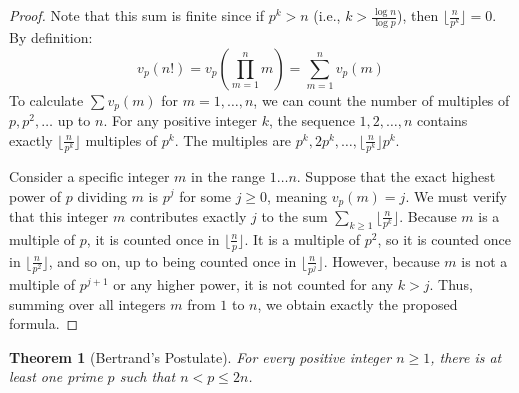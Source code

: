 \documentclass[a4paper]{article}
\newtheorem{theorem}{Theorem}
\begin{document}
\begin{proof}
  Note that this sum is finite since if $p^k > n$ (i.e., $k >
  \frac{\log n}{\log p}$), then $\lfloor \frac{n}{p^k} \rfloor = 0$.
  By definition:
  \[ v_p(n!) = v_p\left(\prod_{m=1}^{n} m\right) = \sum_{m=1}^{n} v_p(m) \]
  To calculate $\sum v_p(m)$ for $m=1, \dots, n$, we can count the
  number of multiples of $p, p^2, \dots$ up to $n$. For any positive
  integer $k$, the sequence $1, 2, \dots, n$ contains exactly
  $\lfloor \frac{n}{p^k} \rfloor$ multiples of $p^k$. The multiples
  are $p^k, 2p^k, \dots, \lfloor \frac{n}{p^k} \rfloor p^k$.

  Consider a specific integer $m$ in the range $1 \dots n$. Suppose
  that the exact highest power of $p$ dividing $m$ is $p^j$ for some
  $j \ge 0$, meaning $v_p(m) = j$. We must verify that this integer
  $m$ contributes exactly $j$ to the sum $\sum_{k \ge 1} \lfloor
  \frac{n}{p^k} \rfloor$.
  Because $m$ is a multiple of $p$, it is counted once in $\lfloor
  \frac{n}{p} \rfloor$. It is a multiple of $p^2$, so it is counted
  once in $\lfloor \frac{n}{p^2} \rfloor$, and so on, up to being
  counted once in $\lfloor \frac{n}{p^j} \rfloor$. However, because
  $m$ is not a multiple of $p^{j+1}$ or any higher power, it is not
  counted for any $k > j$. Thus, summing over all integers $m$ from
  $1$ to $n$, we obtain exactly the proposed formula.
\end{proof}

\begin{theorem}[Bertrand's Postulate]
  For every positive integer $n \ge 1$, there is at least one prime
  $p$ such that $n < p \le 2n$.
\end{theorem}
\end{document}
